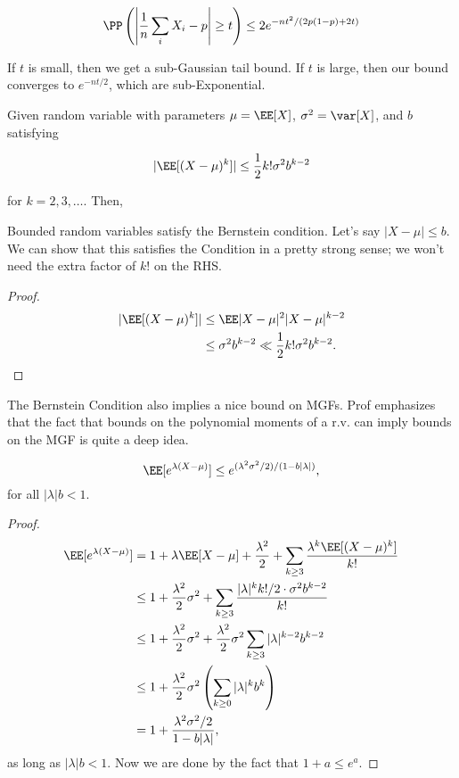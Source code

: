 \[\PP\left(\left\vert\frac{1}{n}\sum_i X_i - p\right\vert\geq t \right) \leq 2e^{-nt^2 / (2p(1-p)+2t)}\]

If $t$ is small, then we get a sub-Gaussian tail bound. If $t$ is large, then our bound converges to $e^{-nt/2}$, which are sub-Exponential.  

\begin{definition}

Given random variable with parameters $\mu=\EE[X]$, $\sigma^2=\var[X]$, and $b$ satisfying

\[\vert \EE[(X-\mu)^k]\vert \leq \frac{1}{2}k!\sigma^2 b^{k-2}\] 

for $k=2,3,\hdots$. Then, 
\end{definition}

\begin{example}
\exlabel

Bounded random variables satisfy the Bernstein condition. Let's say $\vert X-\mu\vert \leq b$. We can show that this satisfies the Condition in a pretty strong sense; we won't need the extra factor of $k!$ on the RHS. 
\end{example}

\begin{proof}
\begin{align*}
	\vert\EE[(X-\mu)^k]\vert &\leq \EE\vert X-\mu\vert^2 \vert X-\mu\vert^{k-2} \\
													 &\leq \sigma^2b^{k-2}\ll \frac{1}{2}k!\sigma^2b^{k-2}. 
\end{align*}
\end{proof}

\begin{example}
\exlabel

The Bernstein Condition also implies a nice bound on MGFs. Prof emphasizes that the fact that bounds on the polynomial moments of a r.v. can imply bounds on the MGF is quite a deep idea.

\[\EE[e^{\lambda(X-\mu)}] \leq e^{(\lambda^2\sigma^2/2)/(1 - b\vert \lambda\vert)},\]
for all $\vert\lambda\vert b < 1$. 
\end{example}

\begin{proof}
\begin{align*}
	\EE[e^{\lambda(X-\mu)}] &= 1 + \lambda \EE[X-\mu] + \frac{\lambda^2}{2} + \sum_{k\geq 3}\frac{\lambda^k \EE[(X-\mu)^k]}{k!} \\
													&\leq 1 + \frac{\lambda^2}{2}\sigma^2 + \sum_{k\geq 3} \frac{\vert \lambda\vert^k k!/2\cdot \sigma^2 b^{k-2}}{k!} \\
													&\leq 1 + \frac{\lambda^2}{2}\sigma^2 + \frac{\lambda^2}{2}\sigma^2 \sum_{k\geq 3} \vert \lambda\vert^{k-2}b^{k-2} \\
													&\leq 1 + \frac{\lambda^2}{2}\sigma^2\left(\sum_{k\geq 0}\vert \lambda\vert^k b^k\right) \\
													&= 1 + \frac{\lambda^2\sigma^2/2}{1 - b\vert \lambda\vert},
\end{align*}
as long as $\vert \lambda\vert b < 1$. Now we are done by the fact that $1 + a\leq e^a$.  
\end{proof}


